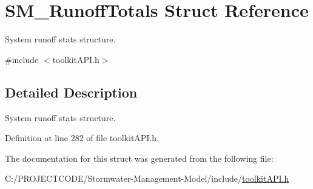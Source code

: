 \hypertarget{struct_s_m___runoff_totals}{}\section{S\+M\+\_\+\+Runoff\+Totals Struct Reference}
\label{struct_s_m___runoff_totals}


System runoff stats structure.  




{\ttfamily \#include $<$toolkit\+A\+P\+I.\+h$>$}



\subsection{Detailed Description}
System runoff stats structure. 

Definition at line 282 of file toolkit\+A\+P\+I.\+h.



The documentation for this struct was generated from the following file\+:\begin{DoxyCompactItemize}
\item 
C\+:/\+P\+R\+O\+J\+E\+C\+T\+C\+O\+D\+E/\+Stormwater-\/\+Management-\/\+Model/include/\hyperlink{toolkit_a_p_i_8h}{toolkit\+A\+P\+I.\+h}\end{DoxyCompactItemize}

